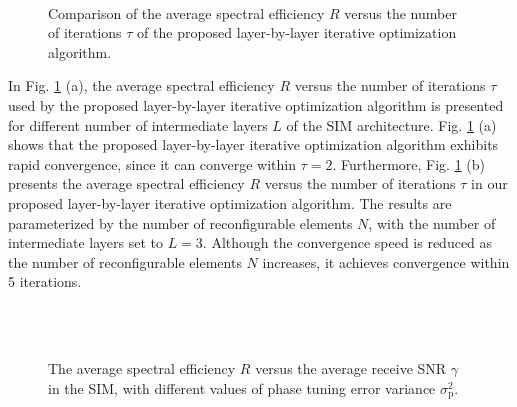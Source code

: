 \documentclass[lettersize,journal]{IEEEtran}
\theoremstyle{remark}
\begin{document}
\begin{figure}[!t]
    \centering
    \\
    \caption{Comparison of the average spectral efficiency $R$ versus the number of iterations $\tau$ of the proposed layer-by-layer iterative optimization algorithm.}\label{Simu_Fig_perfect_56}
\end{figure}

In Fig. \ref{Simu_Fig_perfect_56} (a), the average spectral efficiency $R$ versus the number of iterations $\tau$ used by the proposed layer-by-layer iterative optimization algorithm is presented for different number of intermediate layers $L$ of the SIM architecture. Fig. \ref{Simu_Fig_perfect_56} (a) shows that the proposed layer-by-layer iterative optimization algorithm exhibits rapid convergence, since it can converge within $\tau=2$. Furthermore, Fig. \ref{Simu_Fig_perfect_56} (b) presents the average spectral efficiency $R$ versus the number of iterations $\tau$ in our proposed layer-by-layer iterative optimization algorithm. The results are parameterized by the number of reconfigurable elements $N$, with the number of intermediate layers set to $L=3$. Although the convergence speed is reduced as the number of reconfigurable elements $N$ increases, it achieves convergence within 5 iterations.

\begin{figure}[!t]
    \centering
    \\
    \\
    \caption{The average spectral efficiency $R$ versus the average receive SNR $\gamma$ in the SIM, with different values of phase tuning error variance $\sigma_\mathrm{p}^2$.}\label{Simu_Fig_imperfect_123}
\end{figure}
\end{document}
